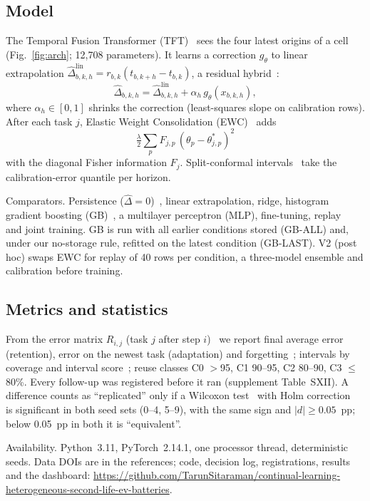 \subsection{Model}
\label{sec:backbones}

The Temporal Fusion Transformer (TFT)~\cite{lim2021tft} sees the four latest origins of a cell (Fig.~\ref{fig:arch}; 12{,}708 parameters). It learns a correction $g_\theta$ to linear extrapolation $\hat\Delta^{\mathrm{lin}}_{b,k,h} = r_{b,k}(t_{b,k+h}-t_{b,k})$, a residual hybrid~\cite{zhang2003hybrid}:
\begin{equation}
  \hat\Delta_{b,k,h} = \hat\Delta^{\mathrm{lin}}_{b,k,h} + \alpha_h\, g_\theta(x_{b,k,h}),
  \label{eq:residual}
\end{equation}
where $\alpha_h\in[0,1]$ shrinks the correction (least-squares slope on calibration rows). After each task $j$, Elastic Weight Consolidation (EWC)~\cite{kirkpatrick2017ewc} adds
\begin{equation}
  \tfrac{\lambda}{2}\textstyle\sum_{p} F_{j,p}\,(\theta_p - \theta^{*}_{j,p})^2
  \label{eq:ewc}
\end{equation}
with the diagonal Fisher information $F_j$. Split-conformal intervals~\cite{lei2018conformal} take the calibration-error quantile per horizon.


Comparators. Persistence ($\hat\Delta=0$)~\cite{hyndman2006}, linear extrapolation, ridge, histogram gradient boosting (GB)~\cite{friedman2001}, a multilayer perceptron (MLP), fine-tuning, replay~\cite{rolnick2019replay} and joint training. GB is run with all earlier conditions stored (GB-ALL) and, under our no-storage rule, refitted on the latest condition (GB-LAST). V2 (post hoc) swaps EWC for replay of 40 rows per condition, a three-model ensemble and calibration before training.

\subsection{Metrics and statistics}
\label{sec:tuning}
\label{sec:metrics}

From the error matrix $R_{i,j}$ (task $j$ after step $i$)~\cite{lopezpaz2017gem} we report final average error (retention), error on the newest task (adaptation) and forgetting~\cite{chaudhry2018rwalk}; intervals by coverage and interval score~\cite{gneiting2007scoring}; reuse classes C0 $>$95, C1 90--95, C2 80--90, C3 $\le$80\%. Every follow-up was registered before it ran (supplement Table~SXII). A difference counts as ``replicated'' only if a Wilcoxon test~\cite{wilcoxon1945} with Holm correction~\cite{holm1979} is significant in both seed sets (0--4, 5--9), with the same sign and $|d|\ge0.05$~pp; below 0.05~pp in both it is ``equivalent''.

Availability. Python~3.11, PyTorch~2.14.1, one processor thread, deterministic seeds. Data DOIs are in the references; code, decision log, registrations, results and the dashboard: \url{https://github.com/TarunSitaraman/continual-learning-heterogeneous-second-life-ev-batteries}.
\label{sec:repro}

